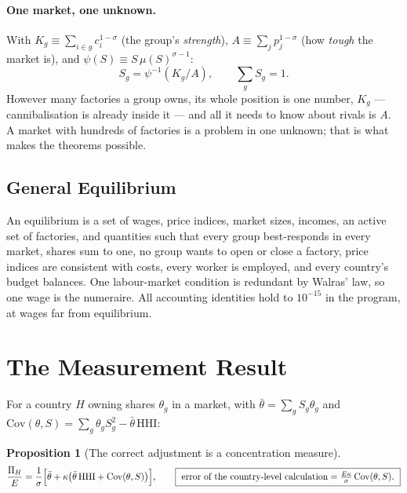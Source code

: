 \documentclass[10pt]{article}
\theoremstyle{plain}
\newtheorem{proposition}{Proposition}
\begin{document}
\paragraph{One market, one unknown.} With $K_g\equiv\sum_{i\in g}c_i^{1-\sigma}$ (the
group's \emph{strength}), $A\equiv\sum_j p_j^{1-\sigma}$ (how \emph{tough} the market
is), and $\psi(S)\equiv S\,\mu(S)^{\sigma-1}$:
\begin{equation}
\boxed{\;S_g=\psi^{-1}\!\left(K_g/A\right),\qquad \textstyle\sum_g S_g=1.\;}
\label{e:share}
\end{equation}
However many factories a group owns, its whole position is one number, $K_g$ ---
cannibalisation is already inside it --- and all it needs to know about rivals is
$A$. A market with hundreds of factories is a problem in one unknown; that is what
makes the theorems possible.

\subsection{General Equilibrium}

An equilibrium is a set of wages, price indices, market sizes, incomes, an active set
of factories, and quantities such that every group best-responds in every market,
shares sum to one, no group wants to open or close a factory, price indices are
consistent with costs, every worker is employed, and every country's budget balances.
One labour-market condition is redundant by Walras' law, so one wage is the
numeraire. All accounting identities hold to $10^{-15}$ in the program, at wages far
from equilibrium.

\section{The Measurement Result}

For a country $H$ owning shares $\theta_g$ in a market, with
$\bar\theta=\sum_g S_g\theta_g$ and $\mathrm{Cov}(\theta,S)=\sum_g\theta_gS_g^2
-\bar\theta\,\mathrm{HHI}$:

\begin{proposition}[The correct adjustment is a concentration measure]\label{p:main}
\begin{equation}
\frac{\Pi_H}{E}=\frac1\sigma\Bigl[\bar\theta+\kappa\bigl(\bar\theta\,\mathrm{HHI}
+\mathrm{Cov}(\theta,S)\bigr)\Bigr],
\qquad
\boxed{\ \text{error of the country-level calculation}
=\tfrac{E\kappa}{\sigma}\,\mathrm{Cov}(\theta,S).\ }
\label{e:main}
\end{equation}
\end{proposition}
\end{document}
